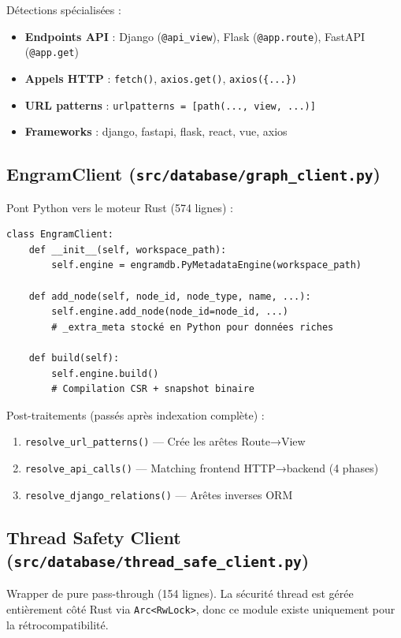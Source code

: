 \documentclass[12pt,a4paper]{article}
\newcommand{\code}[1]{\texttt{#1}}
\begin{document}
Détections spécialisées :
\begin{itemize}
    \item \textbf{Endpoints API} : Django (\code{@api\_view}), Flask (\code{@app.route}), FastAPI (\code{@app.get})
    \item \textbf{Appels HTTP} : \code{fetch()}, \code{axios.get()}, \code{axios(\{...\})}
    \item \textbf{URL patterns} : \code{urlpatterns = [path(..., view, ...)]}
    \item \textbf{Frameworks} : django, fastapi, flask, react, vue, axios
\end{itemize}

\subsection{EngramClient (\code{src/database/graph\_client.py})}

Pont Python vers le moteur Rust (574 lignes) :

\begin{lstlisting}
class EngramClient:
    def __init__(self, workspace_path):
        self.engine = engramdb.PyMetadataEngine(workspace_path)

    def add_node(self, node_id, node_type, name, ...):
        self.engine.add_node(node_id=node_id, ...)
        # _extra_meta stocké en Python pour données riches

    def build(self):
        self.engine.build()
        # Compilation CSR + snapshot binaire
\end{lstlisting}

Post-traitements (passés après indexation complète) :
\begin{enumerate}
    \item \code{resolve\_url\_patterns()} — Crée les arêtes Route→View
    \item \code{resolve\_api\_calls()} — Matching frontend HTTP→backend (4 phases)
    \item \code{resolve\_django\_relations()} — Arêtes inverses ORM
\end{enumerate}

\subsection{Thread Safety Client (\code{src/database/thread\_safe\_client.py})}

Wrapper de pure pass-through (154 lignes). La sécurité thread est gérée entièrement côté Rust via \code{Arc<RwLock>}, donc ce module existe uniquement pour la rétrocompatibilité.
\end{document}
